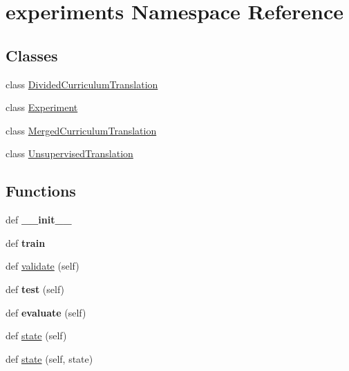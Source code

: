 \hypertarget{namespaceexperiments}{}\section{experiments Namespace Reference}
\label{namespaceexperiments}
\subsection*{Classes}
\begin{DoxyCompactItemize}
\item 
class \hyperlink{classexperiments_1_1DividedCurriculumTranslation}{Divided\+Curriculum\+Translation}
\item 
class \hyperlink{classexperiments_1_1Experiment}{Experiment}
\item 
class \hyperlink{classexperiments_1_1MergedCurriculumTranslation}{Merged\+Curriculum\+Translation}
\item 
class \hyperlink{classexperiments_1_1UnsupervisedTranslation}{Unsupervised\+Translation}
\end{DoxyCompactItemize}
\subsection*{Functions}
\begin{DoxyCompactItemize}
\item 
def {\bfseries \+\_\+\+\_\+init\+\_\+\+\_\+}\hypertarget{namespaceexperiments_aa9fc623b22f0221771b0125e119b8776}{}\label{namespaceexperiments_aa9fc623b22f0221771b0125e119b8776}

\item 
def {\bfseries train}\hypertarget{namespaceexperiments_a6144c0536ac5fe9144b1052e8f4ebf52}{}\label{namespaceexperiments_a6144c0536ac5fe9144b1052e8f4ebf52}

\item 
def \hyperlink{namespaceexperiments_aef86281a6e996d04892cc1e9b5996ff7}{validate} (self)
\item 
def {\bfseries test} (self)\hypertarget{namespaceexperiments_aeea9961f914a7e7dba8f70cf9a6fb26d}{}\label{namespaceexperiments_aeea9961f914a7e7dba8f70cf9a6fb26d}

\item 
def {\bfseries evaluate} (self)\hypertarget{namespaceexperiments_adaad6bc73e2e49ae9afc6f98b0e53e1b}{}\label{namespaceexperiments_adaad6bc73e2e49ae9afc6f98b0e53e1b}

\item 
def \hyperlink{namespaceexperiments_a7936737e034177325b64ae442a2f8390}{state} (self)
\item 
def \hyperlink{namespaceexperiments_a333f2fbb3650e732ed9566e2d65aff63}{state} (self, state)
\end{DoxyCompactItemize}
